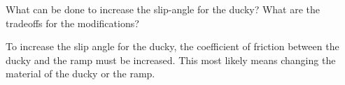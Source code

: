 What can be done to increase the slip-angle for the ducky? What are the tradeoffs for the modifications?

\begin{solution}
    To increase the slip angle for the ducky, the coefficient of friction between the ducky and the ramp must be increased. This most likely means changing the material of the ducky or the ramp.
\end{solution}